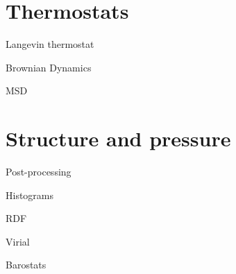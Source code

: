\section{Thermostats}

Langevin thermostat

Brownian Dynamics

MSD

\section{Structure and pressure}

Post-processing

Histograms

RDF

Virial

Barostats

